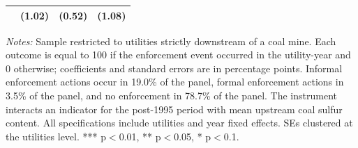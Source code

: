 \begin{table}[htbp]
{\begin{tabular}{p{5.5cm}>{\raggedleft\arraybackslash}p{3cm}>{\raggedleft\arraybackslash}p{3cm}>{\raggedleft\arraybackslash}p{3cm}}
 & (\phantom{-}1.02)\phantom{$^{***}$} & (\phantom{-}0.52)\phantom{$^{***}$} & (\phantom{-}1.08)\phantom{$^{***}$} \\
\bottomrule
\end{tabular}
}
\begin{minipage}{15.6247cm}
\vspace{4pt}
\footnotesize
\raggedright
\textit{Notes:} Sample restricted to utilities strictly downstream of a coal mine. Each outcome is equal to 100 if the enforcement event occurred in the utility-year and 0 otherwise; coefficients and standard errors are in percentage points. Informal enforcement actions occur in 19.0\% of the panel, formal enforcement actions in 3.5\% of the panel, and no enforcement in 78.7\% of the panel. The instrument interacts an indicator for the post-1995 period with mean upstream coal sulfur content. All specifications include utilities and year fixed effects. SEs clustered at the utilities level. *** p$<$0.01, ** p$<$0.05, * p$<$0.1.
\end{minipage}
\end{table}

